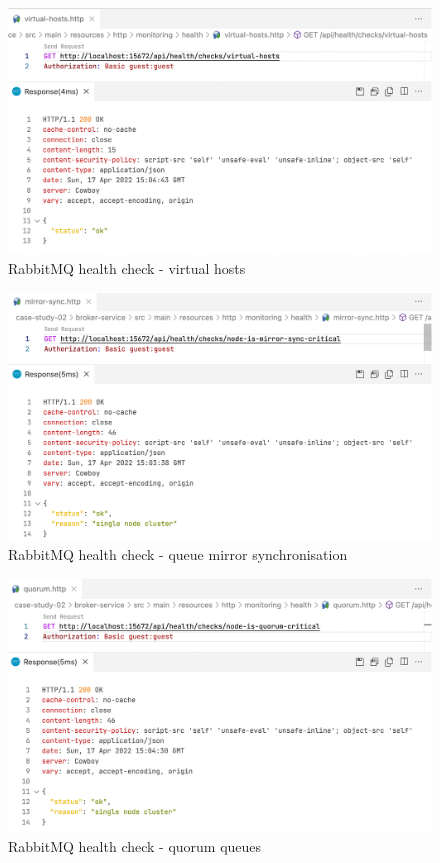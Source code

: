 \begin{figure}[H]
	\centering
	\includegraphics[width=1.0\linewidth]{./assets/images/case-studies/cs02-hc6.png}
	\caption{RabbitMQ health check - virtual hosts}
	\label{fig:cs02-hc6}
\end{figure}

\begin{figure}[H]
	\centering
	\includegraphics[width=1.0\linewidth]{./assets/images/case-studies/cs02-hc7.png}
	\caption{RabbitMQ health check - queue mirror synchronisation}
	\label{fig:cs02-hc7}
\end{figure}

\begin{figure}[H]
	\centering
	\includegraphics[width=1.0\linewidth]{./assets/images/case-studies/cs02-hc8.png}
	\caption{RabbitMQ health check - quorum queues}
	\label{fig:cs02-hc8}
\end{figure}

